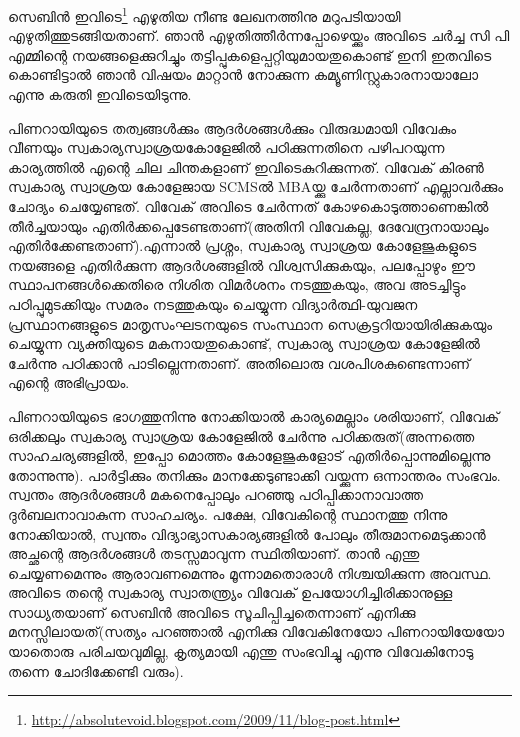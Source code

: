 \vskip 2pt


സെബിന്‍ ഇവിടെ\footnote{\url{http://absolutevoid.blogspot.com/2009/11/blog-post.html}} എഴുതിയ നീണ്ട ലേഖനത്തിനു മറുപടിയായി എഴുതിത്തുടങ്ങിയതാണ്. ഞാന്‍ എഴുതിത്തീര്‍ന്നപ്പോഴെയ്ക്കും അവിടെ ചര്‍ച്ച സി പി എമ്മിന്റെ നയങ്ങളെക്കുറിച്ചും തട്ടിപ്പുകളെപ്പറ്റിയുമായതുകൊണ്ട് ഇനി ഇതവിടെ കൊണ്ടിട്ടാല്‍ ഞാന്‍ വിഷയം മാറ്റാന്‍ നോക്കുന്ന കമ്യൂണിസ്റ്റുകാരനായാലോ എന്നു കരുതി ഇവിടെയിടുന്നു.

പിണറായിയുടെ തത്വങ്ങള്‍ക്കും ആദര്‍ശങ്ങള്‍ക്കും വിരുദ്ധമായി വിവേകും വീണയും സ്വകാര്യസ്വാശ്രയകോളേജില്‍ പഠിക്കുന്നതിനെ പഴിപറയുന്ന കാര്യത്തില്‍ എന്റെ ചില ചിന്തകളാണ് ഇവിടെകുറിക്കുന്നത്. വിവേക് കിരണ്‍ സ്വകാര്യ സ്വാശ്രയ കോളേജായ SCMSല്‍ MBAയ്ക്കു ചേര്‍ന്നതാണ് എല്ലാവര്‍ക്കും ചോദ്യം ചെയ്യേണ്ടത്. വിവേക് അവിടെ ചേര്‍ന്നത് കോഴകൊടുത്താണെങ്കില്‍ തീര്‍ച്ചയായും എതിര്‍ക്കപ്പെടേണ്ടതാണ്(അതിനി വിവേകല്ല, ദേവേന്ദ്രനായാലും എതിര്‍ക്കേണ്ടതാണ്).എന്നാല്‍ പ്രശ്നം, സ്വകാര്യ സ്വാശ്രയ കോളേജുകളുടെ നയങ്ങളെ എതിര്‍ക്കുന്ന ആദര്‍ശങ്ങളില്‍ വിശ്വസിക്കുകയും, പലപ്പോഴും ഈ സ്ഥാപനങ്ങള്‍ക്കെതിരെ നിശിത വിമര്‍ശനം നടത്തുകയും, അവ അടച്ചിട്ടും പഠിപ്പുമുടക്കിയും സമരം നടത്തുകയും ചെയ്യുന്ന വിദ്യാര്‍ത്ഥി-യുവജന പ്രസ്ഥാനങ്ങളുടെ മാതൃസംഘടനയുടെ സംസ്ഥാന സെക്രട്ടറിയായിരിക്കുകയും ചെയ്യുന്ന വ്യക്തിയുടെ മകനായതുകൊണ്ട്, സ്വകാര്യ സ്വാശ്രയ കോളേജില്‍ ചേര്‍ന്നു പഠിക്കാന്‍ പാടില്ലെന്നതാണ്. അതിലൊരു വശപിശകുണ്ടെന്നാണ് എന്റെ അഭിപ്രായം.

പിണറായിയുടെ ഭാഗത്തുനിന്നു നോക്കിയാല്‍ കാര്യമെല്ലാം ശരിയാണ്, വിവേക് ഒരിക്കലും സ്വകാര്യ സ്വാശ്രയ കോളേജില്‍ ചേര്‍ന്നു പഠിക്കരുത്(അന്നത്തെ സാഹചര്യങ്ങളില്‍, ഇപ്പോ മൊത്തം കോളേജുകളോട് എതിര്‍പ്പൊന്നുമില്ലെന്നു തോന്നുന്നു). പാര്‍ട്ടിക്കും തനിക്കും മാനക്കേടുണ്ടാക്കി വയ്ക്കുന്ന ഒന്നാന്തരം സംഭവം. സ്വന്തം ആദര്‍ശങ്ങള്‍ മകനെപ്പോലും പറഞ്ഞു പഠിപ്പിക്കാനാവാത്ത ദുര്‍ബലനാവാകുന്ന സാഹചര്യം. പക്ഷേ, വിവേകിന്റെ സ്ഥാനത്തു നിന്നു നോക്കിയാല്‍, സ്വന്തം വിദ്യാഭ്യാസകാര്യങ്ങളില്‍ പോലും തീരുമാനമെടുക്കാന്‍ അച്ഛന്റെ ആദര്‍ശങ്ങള്‍ തടസ്സമാവുന്ന സ്ഥിതിയാണ്. താന്‍ എന്തു ചെയ്യണമെന്നും ആരാവണമെന്നും മൂന്നാമതൊരാള്‍ നിശ്ചയിക്കുന്ന അവസ്ഥ. അവിടെ തന്റെ സ്വകാര്യ സ്വാതന്ത്ര്യം വിവേക് ഉപയോഗിച്ചിരിക്കാനുള്ള സാധ്യതയാണ് സെബിന്‍ അവിടെ സൂചിപ്പിച്ചതെന്നാണ് എനിക്കു മനസ്സിലായത്(സത്യം പറഞ്ഞാല്‍ എനിക്കു വിവേകിനേയോ പിണറായിയേയോ യാതൊരു പരിചയവുമില്ല, കൃത്യമായി എന്തു സംഭവിച്ചു എന്നു വിവേകിനോടു തന്നെ ചോദിക്കേണ്ടി വരും).

